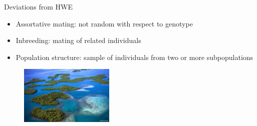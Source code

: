 \begin{frame}{Deviations from HWE}

	\small
	\begin{itemize}
		\item Assortative mating: not random with respect to genotype
		\pause
		\item Inbreeding: mating of related individuals
		\pause
		\item Population structure: sample of individuals from two or more subpopulations
	\end{itemize}

 	\begin{figure}
        	\includegraphics[width=0.4\textwidth]{Pics/galapagos}
        \end{figure}


\end{frame}


